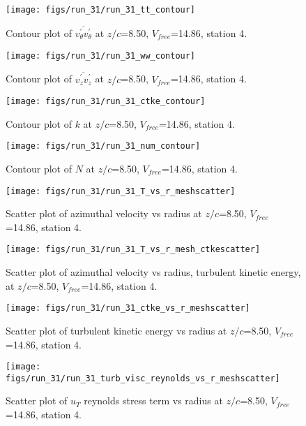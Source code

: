 \begin{figure}[H]
\centering
\texttt{[image: figs/run\_31/run\_31\_tt\_contour]}
\caption{Contour plot of $\overline{v_{\theta}^{\prime} v_{\theta}^{\prime}}$ at $z/c$=8.50, $V_{free}$=14.86, station 4.}
\end{figure}


\begin{figure}[H]
\centering
\texttt{[image: figs/run\_31/run\_31\_ww\_contour]}
\caption{Contour plot of $\overline{v_{z}^{\prime} v_{z}^{\prime}}$ at $z/c$=8.50, $V_{free}$=14.86, station 4.}
\end{figure}


\begin{figure}[H]
\centering
\texttt{[image: figs/run\_31/run\_31\_ctke\_contour]}
\caption{Contour plot of $k$ at $z/c$=8.50, $V_{free}$=14.86, station 4.}
\end{figure}


\begin{figure}[H]
\centering
\texttt{[image: figs/run\_31/run\_31\_num\_contour]}
\caption{Contour plot of $N$ at $z/c$=8.50, $V_{free}$=14.86, station 4.}
\end{figure}


\begin{figure}[H]
\centering
\texttt{[image: figs/run\_31/run\_31\_T\_vs\_r\_meshscatter]}
\caption{Scatter plot of azimuthal velocity vs radius at $z/c$=8.50, $V_{free}$=14.86, station 4.}
\end{figure}


\begin{figure}[H]
\centering
\texttt{[image: figs/run\_31/run\_31\_T\_vs\_r\_mesh\_ctkescatter]}
\caption{Scatter plot of azimuthal velocity vs radius, turbulent kinetic energy, at $z/c$=8.50, $V_{free}$=14.86, station 4.}
\end{figure}


\begin{figure}[H]
\centering
\texttt{[image: figs/run\_31/run\_31\_ctke\_vs\_r\_meshscatter]}
\caption{Scatter plot of turbulent kinetic energy vs radius at $z/c$=8.50, $V_{free}$=14.86, station 4.}
\end{figure}


\begin{figure}[H]
\centering
\texttt{[image: figs/run\_31/run\_31\_turb\_visc\_reynolds\_vs\_r\_meshscatter]}
\caption{Scatter plot of $
u_T$ reynolds stress term vs radius at $z/c$=8.50, $V_{free}$=14.86, station 4.}
\end{figure}


